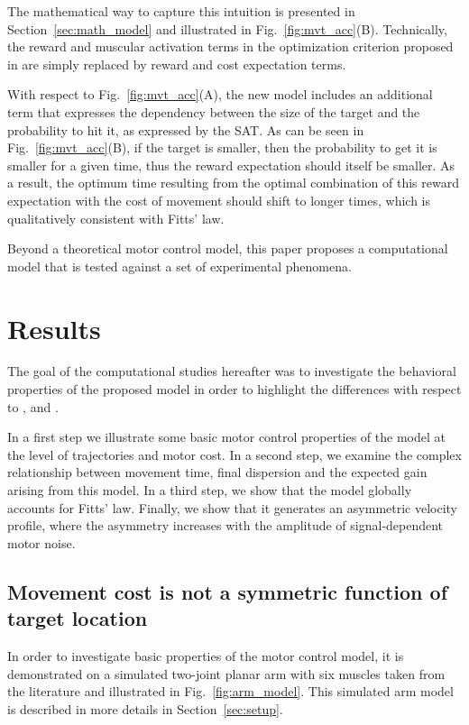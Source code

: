\documentclass[10pt]{article}
\begin{document}
The mathematical way to capture this intuition is presented in Section~\ref{sec:math_model} and illustrated in Fig.~\ref{fig:mvt_acc}(B). Technically, the reward and muscular activation terms in the optimization criterion proposed in \cite{rigoux12} are simply replaced by reward and cost expectation terms. 

With respect to Fig.~\ref{fig:mvt_acc}(A), the new model includes an additional term that expresses the dependency between the size of the target and the probability to hit it, as expressed by the SAT. As can be seen in Fig.~\ref{fig:mvt_acc}(B), if the target is smaller, then the probability to get it is smaller for a given time, thus the reward expectation should itself be smaller. As a result, the optimum time resulting from the optimal combination of this reward expectation with the cost of movement should shift to longer times, which is qualitatively consistent with Fitts' law.

Beyond a theoretical motor control model, this paper proposes a computational model that is tested against a set of experimental phenomena. 

\section{Results}
\label{sec:results}

The goal of the computational studies hereafter was to investigate the behavioral properties of the proposed model in order to highlight the differences with respect to \cite{shadmehr10}, \cite{rigoux12} and \cite{Dean2007}.

In a first step we illustrate some basic motor control properties of the model at the level of trajectories and motor cost.
In a second step, we examine the complex relationship between movement time, final dispersion and the expected gain arising from this model.
In a third step, we show that the model globally accounts for Fitts' law.
Finally, we show that it generates an asymmetric velocity profile, where the asymmetry increases with the amplitude of signal-dependent motor noise.

\subsection{Movement cost is not a symmetric function of target location}
\label{sec:perf_xcsf}

In order to investigate basic properties of the motor control model, it is demonstrated on a simulated two-joint planar arm with six muscles taken from the literature and illustrated in Fig.~\ref{fig:arm_model}. This simulated arm model is described in more details in Section~\ref{sec:setup}.
\end{document}
